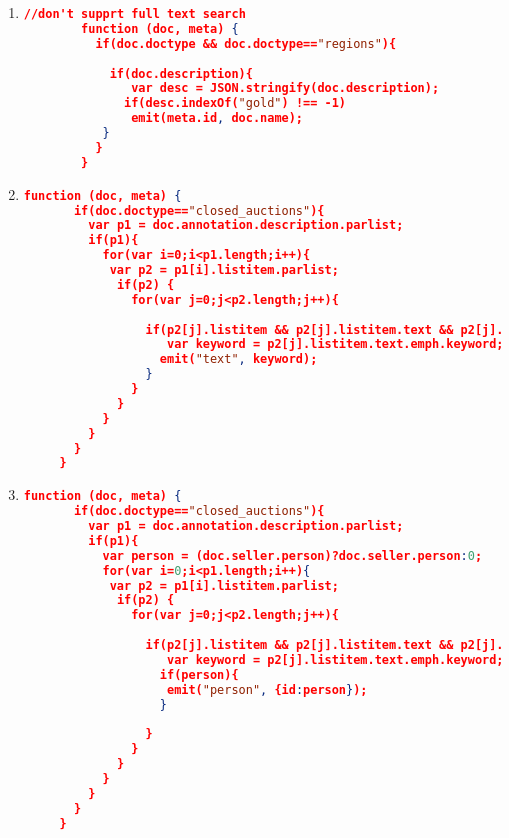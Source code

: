 \begin{enumerate}[label=Q\arabic*.]
\begin{lstlisting}[language=JSON, basicstyle=\scriptsize]
	       }
	     }
	   }
	\end{lstlisting}
	
    \item %
	\begin{lstlisting}[language=JSON, basicstyle=\scriptsize]
		//don't supprt full text search
	 	function (doc, meta) {
	 	  if(doc.doctype && doc.doctype=="regions"){
	 	   
	 	    if(doc.description){
	 	       var desc = JSON.stringify(doc.description);
	 	      if(desc.indexOf("gold") !== -1)
	 	       emit(meta.id, doc.name);
	 	   }
	 	  }
	 	}
	\end{lstlisting}	

    \item %
	\begin{lstlisting}[language=JSON, basicstyle=\scriptsize]
	 function (doc, meta) {
	   if(doc.doctype=="closed_auctions"){
	     var p1 = doc.annotation.description.parlist;
	     if(p1){
	       for(var i=0;i<p1.length;i++){
	       	var p2 = p1[i].listitem.parlist;
	         if(p2) {
	           for(var j=0;j<p2.length;j++){
	             
	             if(p2[j].listitem && p2[j].listitem.text && p2[j].listitem.text.emph && p2[j].listitem.text.emph.keyword){
	             	var keyword = p2[j].listitem.text.emph.keyword;
	               emit("text", keyword);   
	             }
	           }
	         }
	       }
	     }
	   }
	 }
	\end{lstlisting}	

    \item %
	\begin{lstlisting}[language=JSON, basicstyle=\scriptsize]
	 function (doc, meta) {
	   if(doc.doctype=="closed_auctions"){
	     var p1 = doc.annotation.description.parlist;
	     if(p1){
	       var person = (doc.seller.person)?doc.seller.person:0;
	       for(var i=0;i<p1.length;i++){
	       	var p2 = p1[i].listitem.parlist;
	         if(p2) {
	           for(var j=0;j<p2.length;j++){
	             
	             if(p2[j].listitem && p2[j].listitem.text && p2[j].listitem.text.emph && p2[j].listitem.text.emph.keyword){
	             	var keyword = p2[j].listitem.text.emph.keyword;
	               if(person){
	               	emit("person", {id:person});     
	               }
	               
	             }
	           }
	         }
	       }
	     }
	   }
	 }
	\end{lstlisting}	


\end{enumerate}
